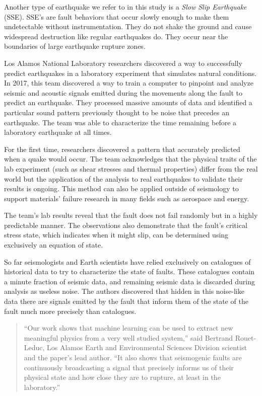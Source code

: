 \documentclass[]{llncs}
\begin{document}
Another type of earthquake we refer to in this study is a {\em Slow Slip Earthquake} (SSE). SSE's are fault behaviors that occur slowly enough to make them undetectable without instrumentation. They do not shake the ground and cause widespread destruction like regular earthquakes do. They occur near the boundaries of large earthquake rupture zones\cite{Slip}. \par

Los Alamos National Laboratory researchers discovered a way to successfully predict earthquakes in a laboratory experiment that simulates natural conditions. In 2017, this team discovered a way to train a computer to pinpoint and analyze seismic and acoustic signals emitted during the movements along the fault to predict an earthquake. They processed massive amounts of data and identified a particular sound pattern previously thought to be noise that precedes an earthquake. The team was able to characterize the time remaining before a laboratory earthquake at all times.\cite{LANLNews} \par

For the first time, researchers discovered a pattern that accurately predicted when a quake would occur. The team acknowledges that the physical traits of the lab experiment (such as shear stresses and thermal properties) differ from the real world but the application of the analysis to real earthquakes to validate their results is ongoing. This method can also be applied outside of seismology to support materials’ failure research in many fields such as aerospace and energy.\cite{LANLNews}\par

The team’s lab results reveal that the fault does not fail randomly but in a highly predictable manner. The observations also demonstrate that the fault’s critical stress state, which indicates when it might slip, can be determined using exclusively an equation of state.\cite{LANLNews}\par

So far seismologists and Earth scientists have relied exclusively on catalogues of historical data to try to characterize the state of faults. These catalogues contain a minute fraction of seismic data, and remaining seismic data is discarded during analysis as useless noise. The authors discovered that hidden in this noise-like data there are signals emitted by the fault that inform them of the state of the fault much more precisely than catalogues.\cite{LANLNews}\par
\begin{quote}
“Our work shows that machine learning can be used to extract new meaningful physics from a very well studied system,” said Bertrand Rouet-Leduc, Los Alamos Earth and Environmental Sciences Division scientist and the paper’s lead author. “It also shows that seismogenic faults are continuously broadcasting a signal that precisely informs us of their physical state and how close they are to rupture, at least in the laboratory.”
\end{quote}
\end{document}
